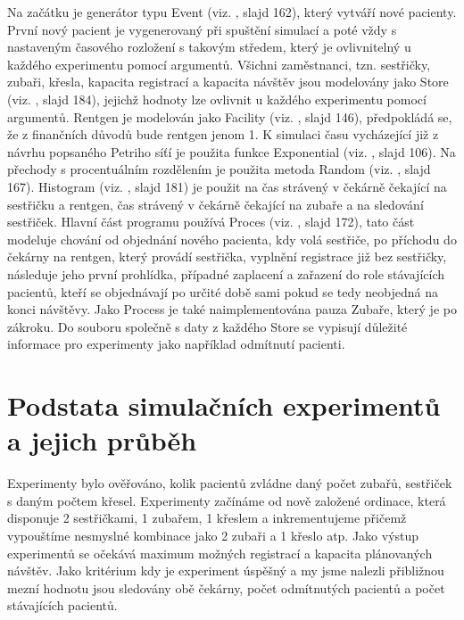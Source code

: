 \documentclass[a4paper,11pt,titlepage]{article}
\begin{document}
Na začátku je generátor typu Event (viz. \cite{ims}, slajd 162), který vytváří nové pacienty. První nový pacient je vygenerovaný při spuštění simulací a poté vždy s nastaveným časového rozložení s takovým středem, který je ovlivnitelný u každého experimentu pomocí argumentů.
\newline
Všichni zaměstnanci, tzn. sestřičky, zubaři, křesla, kapacita registrací a kapacita návštěv jsou modelovány jako Store (viz. \cite{ims}, slajd 184), jejichž hodnoty lze ovlivnit u každého experimentu pomocí argumentů.
\newline
Rentgen je modelován jako Facility (viz. \cite{ims}, slajd 146), předpokládá se, že z finančních důvodů bude rentgen jenom 1.
\newline
K simulaci času vycházející již z návrhu popsaného Petriho síťí je použita funkce Exponential (viz. \cite{ims}, slajd 106).
\newline
Na přechody s procentuálním rozdělením je použita metoda Random (viz. \cite{ims}, slajd 167).
\newline
Histogram (viz. \cite{ims}, slajd 181) je použit na čas strávený v čekárně čekající na sestřičku a rentgen, čas strávený v čekárně čekající na zubaře a na sledování sestřiček.
\newline
Hlavní část programu používá Proces (viz. \cite{ims}, slajd 172), tato část modeluje chování od objednání nového pacienta, kdy volá sestřiče, po příchodu do čekárny na rentgen, který provádí sestřička, vyplnění registrace již bez sestřičky, následuje jeho první prohlídka, případné zaplacení a zařazení do role stávajících pacientů, kteří se objednávají po určité době sami pokud se tedy neobjedná na konci návštěvy.
\newline
Jako Process je také naimplementována pauza Zubaře, který je po zákroku.
\newline
Do souboru společně s daty z každého Store se vypisují důležité informace pro experimenty jako například odmítnutí pacienti.

\section{Podstata simulačních experimentů a jejich průběh}

Experimenty bylo ověřováno, kolik pacientů zvládne daný počet zubařů, sestřiček s daným počtem křesel. Experimenty začínáme od nově založené ordinace, která disponuje 2 sestřičkami, 1 zubařem, 1 křeslem a inkrementujeme přičemž vypouštíme nesmyslné kombinace jako 2 zubaři a 1 křeslo atp. Jako výstup experimentů se očekává maximum možných registrací a kapacita plánovaných návštěv. Jako kritérium kdy je experiment úspěšný a my jsme nalezli přibližnou mezní hodnotu jsou sledovány obě čekárny, počet odmítnutých pacientů a počet stávajících pacientů.
\end{document}
